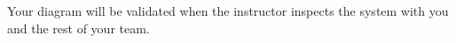









Your diagram will be validated when the instructor inspects the system with you and the rest of your team.











